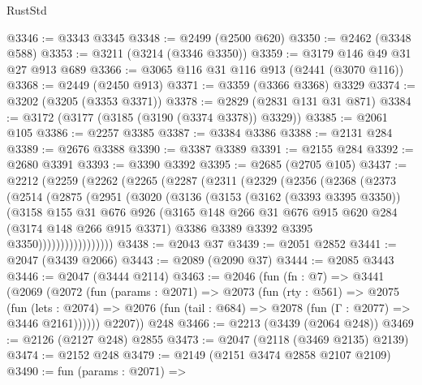 \begin{lexlean}{RustStd}
\begin{coremodule}
@3346 := @3343 @3345
@3348 := @2499 (@2500 @620)
@3350 := @2462 (@3348 @588)
@3353 := @3211 (@3214 (@3346 @3350))
@3359 := @3179 @146 @49 @31 @27 @913 @689
@3366 := @3065 @116 @31 @116 @913 (@2441 (@3070 @116))
@3368 := @2449 (@2450 @913)
@3371 := @3359 (@3366 @3368) @3329
@3374 := @3202 (@3205 (@3353 @3371))
@3378 := @2829 (@2831 @131 @31 @871)
@3384 := @3172 (@3177 (@3185 (@3190 (@3374 @3378)) @3329))
@3385 := @2061 @105
@3386 := @2257 @3385
@3387 := @3384 @3386
@3388 := @2131 @284
@3389 := @2676 @3388
@3390 := @3387 @3389
@3391 := @2155 @284
@3392 := @2680 @3391
@3393 := @3390 @3392
@3395 := @2685 (@2705 @105)
@3437 := @2212
    (@2259
      (@2262
        (@2265
          (@2287
            (@2311
              (@2329
                (@2356
                  (@2368
                    (@2373
                      (@2514
                        (@2875
                          (@2951
                            (@3020
                              (@3136
                                (@3153
                                  (@3162 (@3393 @3395 @3350))
                                  (@3158
                                    @155
                                    @31
                                    @676
                                    @926
                                    (@3165
                                      @148
                                      @266
                                      @31
                                      @676
                                      @915
                                      @620
                                      @284
                                      (@3174 @148 @266 @915 @3371)
                                      @3386
                                      @3389
                                      @3392
                                      @3395
                                      @3350)))))))))))))))))
@3438 := @2043 @37
@3439 := @2051 @2852
@3441 := @2047 (@3439 @2066)
@3443 := @2089 (@2090 @37)
@3444 := @2085 @3443
@3446 := @2047 (@3444 @2114)
@3463 := @2046
    (fun (fn : @7) =>
    @3441
      (@2069
        (@2072
          (fun (params : @2071) =>
          @2073
            (fun (rty : @561) =>
            @2075
              (fun (lets : @2074) =>
              @2076 (fun (tail : @684) => @2078 (fun (Γ : @2077) => @3446 @2161))))))
        @2207))
    @248
@3466 := @2213 (@3439 (@2064 @248))
@3469 := @2126 (@2127 @248) @2855
@3473 := @2047 (@2118 (@3469 @2135) @2139)
@3474 := @2152 @248
@3479 := @2149 (@2151 @3474 @2858 @2107 @2109)
@3490 := fun (params : @2071) =>

\end{coremodule}
\end{lexlean}
